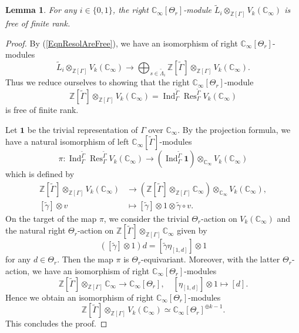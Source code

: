 \documentclass[10pt,a4paper]{amsart}
\newtheorem{lem}{Lemma}
\newcommand{\Cinf}{\mathbb{C}_{\infty}}
\DeclareMathOperator{\Ind}{Ind}
\DeclareMathOperator{\Res}{Res}
\newcommand{\bZ}{\mathbb{Z}}
\begin{document}
\begin{lem}\label{LemThetaFreeOfResolution}
	For any $i\in\{0,1\}$, the right $\Cinf[\Theta_r]$-module $\tilde{L}_i\otimes_{\bZ[\Gamma]}V_k(\Cinf)$ is free of finite rank.
\end{lem}

\begin{proof}
	By (\ref{EqnResolAreFree}), we have an isomorphism of right $\Cinf[\Theta_r]$-modules
	\[
	\tilde{L}_i\otimes_{\bZ[\Gamma]}V_k(\Cinf)\to \bigoplus_{s\in \tilde{\Lambda}_{i}} \bZ[\tilde{\Gamma}]\otimes_{\bZ[\Gamma]}V_k(\Cinf).
	\]
	Thus we reduce ourselves to showing that the right $\Cinf[\Theta_r]$-module
	\[
	 \bZ[\tilde{\Gamma}]\otimes_{\bZ[\Gamma]}V_k(\Cinf)=\Ind_{\Gamma}^{\tilde{\Gamma}}\Res_{\Gamma}^{\tilde{\Gamma}}V_k(\Cinf)
	\]
	is free of finite rank.
	
	Let $\mathbf{1}$ be the trivial representation of $\Gamma$ over $\Cinf$. By the projection formula, we have a natural isomorphism of left $\Cinf[\tilde{\Gamma}]$-modules
	\[
	\pi:\Ind_{\Gamma}^{\tilde{\Gamma}}\Res_{\Gamma}^{\tilde{\Gamma}}V_k(\Cinf)\to (\Ind_{\Gamma}^{\tilde{\Gamma}}\mathbf{1})\otimes_{\Cinf} V_k(\Cinf)
	\]
	which is defined by
	\[
	\begin{aligned}
	 \bZ[\tilde{\Gamma}]\otimes_{\bZ[\Gamma]}V_k(\Cinf)&\to  (\bZ[\tilde{\Gamma}]\otimes_{\bZ[\Gamma]}\Cinf)\otimes_{\Cinf} V_k(\Cinf),\\
	 [\tilde{\gamma}]\otimes v&\mapsto [\tilde{\gamma}]\otimes 1 \otimes \tilde{\gamma}\circ v.
	 \end{aligned}
	\]
	On the target of the map $\pi$, we consider the trivial $\Theta_r$-action on $V_k(\Cinf)$ and
	the natural right $\Theta_r$-action on $\bZ[\tilde{\Gamma}]\otimes_{\bZ[\Gamma]}\Cinf$ given by
	\[
	([\tilde{\gamma}]\otimes 1)d=[\tilde{\gamma}\eta_{[1,d]}]\otimes 1
	\]
	for any $d\in \Theta_r$.
	Then the map $\pi$ is $\Theta_r$-equivariant. Moreover, with the latter $\Theta_r$-action, 
	we have an isomorphism of right $\Cinf[\Theta_r]$-modules
	\[
	\bZ[\tilde{\Gamma}]\otimes_{\bZ[\Gamma]}\Cinf\to \Cinf[\Theta_r],\quad [\eta_{[1,d]}]\otimes 1\mapsto [d].
	\]
	Hence we obtain an isomorphism of right $\Cinf[\Theta_r]$-modules
	\[
	\bZ[\tilde{\Gamma}]\otimes_{\bZ[\Gamma]}V_k(\Cinf)\simeq \Cinf[\Theta_r]^{\oplus k-1}.
	\]
	This concludes the proof.
\end{proof}
\end{document}
